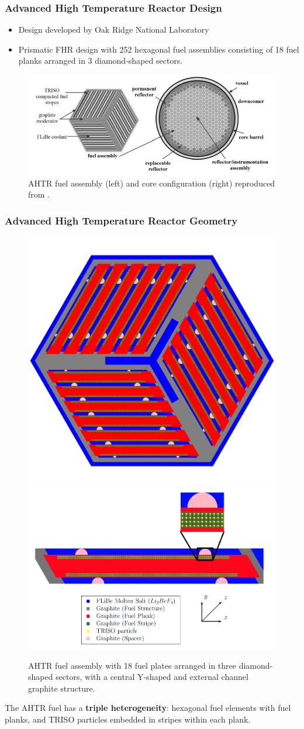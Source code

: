     \begin{frame}
    \frametitle{Advanced High Temperature Reactor Design}
        \begin{itemize}
        \item Design developed by Oak Ridge National Laboratory
        \item Prismatic FHR design with 252 hexagonal fuel assemblies consisting of 
        18 fuel planks arranged in 3 diamond-shaped sectors. 
        \end{itemize}
    \begin{figure}[]
        \centering
        \includegraphics[width=0.9\linewidth]{../docs/figures/ahtr.png} 
        \caption{\acrlong{AHTR} fuel assembly (left) and core configuration (right) 
        reproduced from \cite{ramey_monte_2018}.}
        \label{fig:ahtr}
    \end{figure}
    \end{frame}

    \begin{frame}
    \frametitle{Advanced High Temperature Reactor Geometry}
    \begin{figure}[]
        \includegraphics[width=0.45\linewidth]{../docs/figures/ahtr-fuel-element.png} 
        \includegraphics[width=0.45\linewidth]{figures/ahtr-plank.png}
        \caption{AHTR fuel assembly with 18 fuel plates arranged in 
        three diamond-shaped sectors, with a central Y-shaped and external channel 
        graphite structure.}
    \end{figure}
    \vspace{-0.2cm}
    The AHTR fuel has a \textbf{triple heterogeneity}: hexagonal fuel elements with 
    fuel planks, and TRISO particles embedded in stripes within each plank.
    \end{frame}

